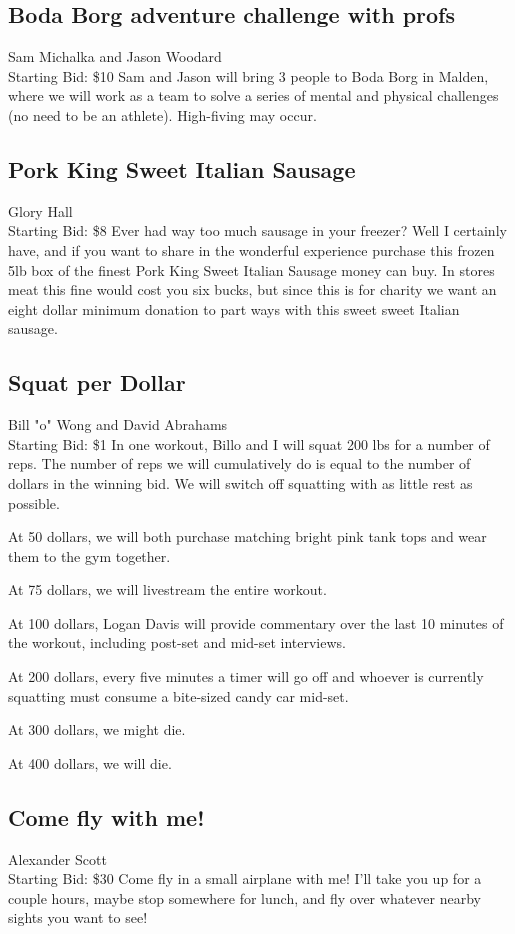 \documentclass[11pt]{article}
\begin{document}
\subsection{Boda Borg adventure challenge with profs}
Sam Michalka and Jason Woodard
\\
Starting Bid: \$10
\newline
Sam and Jason will bring 3 people to Boda Borg in Malden, where we will work as a team to solve a series of mental and physical challenges (no need to be an athlete).  High-fiving may occur.
\subsection{Pork King Sweet Italian Sausage}
Glory Hall
\\
Starting Bid: \$8
\newline
Ever had way too much sausage in your freezer? Well I certainly have, and if you want to share in the wonderful experience purchase this frozen 5lb box of the finest Pork King Sweet Italian Sausage money can buy. In stores meat this fine would cost you six bucks, but since this is for charity we want an eight dollar minimum donation to part ways with this sweet sweet Italian sausage.
\subsection{Squat per Dollar}
Bill "o" Wong and David Abrahams
\\
Starting Bid: \$1
\newline
In one workout, Billo and I will squat 200 lbs for a number of reps. The number of reps we will cumulatively do is equal to the number of dollars in the winning bid. We will switch off squatting with as little rest as possible.

At 50 dollars, we will both purchase matching bright pink tank tops and wear them to the gym together.

At 75 dollars, we will livestream the entire workout.

At 100 dollars, Logan Davis will provide commentary over the last 10 minutes of the workout, including post-set and mid-set interviews.

At 200 dollars, every five minutes a timer will go off and whoever is currently squatting must consume a bite-sized candy car mid-set.

At 300 dollars, we might die.

At 400 dollars, we will die.
\subsection{Come fly with me!}
Alexander Scott
\\
Starting Bid: \$30
\newline
Come fly in a small airplane with me! I'll take you up for a couple hours, maybe stop somewhere for lunch, and fly over whatever nearby sights you want to see!
\end{document}
